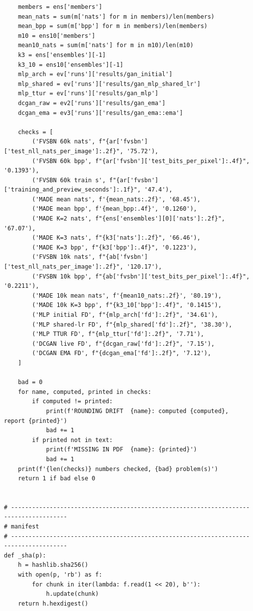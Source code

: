 \begin{lstlisting}
    members = ens['members']
    mean_nats = sum(m['nats'] for m in members)/len(members)
    mean_bpp = sum(m['bpp'] for m in members)/len(members)
    m10 = ens10['members']
    mean10_nats = sum(m['nats'] for m in m10)/len(m10)
    k3 = ens['ensembles'][-1]
    k3_10 = ens10['ensembles'][-1]
    mlp_arch = ev['runs']['results/gan_initial']
    mlp_shared = ev['runs']['results/gan_mlp_shared_lr']
    mlp_ttur = ev['runs']['results/gan_mlp']
    dcgan_raw = ev2['runs']['results/gan_ema']
    dcgan_ema = ev3['runs']['results/gan_ema::ema']

    checks = [
        ('FVSBN 60k nats', f"{ar['fvsbn']['test_nll_nats_per_image']:.2f}", '75.72'),
        ('FVSBN 60k bpp', f"{ar['fvsbn']['test_bits_per_pixel']:.4f}", '0.1393'),
        ('FVSBN 60k train s', f"{ar['fvsbn']['training_and_preview_seconds']:.1f}", '47.4'),
        ('MADE mean nats', f'{mean_nats:.2f}', '68.45'),
        ('MADE mean bpp', f'{mean_bpp:.4f}', '0.1260'),
        ('MADE K=2 nats', f"{ens['ensembles'][0]['nats']:.2f}", '67.07'),
        ('MADE K=3 nats', f"{k3['nats']:.2f}", '66.46'),
        ('MADE K=3 bpp', f"{k3['bpp']:.4f}", '0.1223'),
        ('FVSBN 10k nats', f"{ab['fvsbn']['test_nll_nats_per_image']:.2f}", '120.17'),
        ('FVSBN 10k bpp', f"{ab['fvsbn']['test_bits_per_pixel']:.4f}", '0.2211'),
        ('MADE 10k mean nats', f'{mean10_nats:.2f}', '80.19'),
        ('MADE 10k K=3 bpp', f"{k3_10['bpp']:.4f}", '0.1415'),
        ('MLP initial FD', f"{mlp_arch['fd']:.2f}", '34.61'),
        ('MLP shared-lr FD', f"{mlp_shared['fd']:.2f}", '38.30'),
        ('MLP TTUR FD', f"{mlp_ttur['fd']:.2f}", '7.71'),
        ('DCGAN live FD', f"{dcgan_raw['fd']:.2f}", '7.15'),
        ('DCGAN EMA FD', f"{dcgan_ema['fd']:.2f}", '7.12'),
    ]

    bad = 0
    for name, computed, printed in checks:
        if computed != printed:
            print(f'ROUNDING DRIFT  {name}: computed {computed}, report {printed}')
            bad += 1
        if printed not in text:
            print(f'MISSING IN PDF  {name}: {printed}')
            bad += 1
    print(f'{len(checks)} numbers checked, {bad} problem(s)')
    return 1 if bad else 0


# --------------------------------------------------------------------------------------
# manifest
# --------------------------------------------------------------------------------------
def _sha(p):
    h = hashlib.sha256()
    with open(p, 'rb') as f:
        for chunk in iter(lambda: f.read(1 << 20), b''):
            h.update(chunk)
    return h.hexdigest()



\end{lstlisting}
